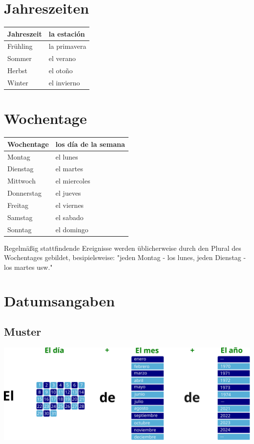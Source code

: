 \documentclass{spanish_summary}
\begin{document}
\section*{Jahreszeiten}
\begin{longtable}{p{} | p{}} 
\textbf{Jahreszeit}     & \textbf{la estación}                                       \\ \hline
\hline
\endhead %
Frühling & la primavera \\
Sommer & el verano \\
Herbst & el oto\~{n}o \\
Winter & el invierno \\
\end{longtable}

\newpage

\section*{Wochentage}
\begin{longtable}{p{} | p{}} 
\textbf{Wochentage}     & \textbf{los día de la semana}                                       \\ \hline
\hline
\endhead %
Montag & el lunes \\
Dienstag & el martes\\
Mittwoch & el miercoles \\
Donnerstag & el jueves \\
Freitag & el viernes\\
Samstag & el sabado \\
Sonntag & el domingo \\
\end{longtable}
Regelmäßig stattfindende Ereignisse werden üblicherweise durch den Plural des Wochentages gebildet, besipielsweise: "jeden Montag - los lunes, jeden Dienstag - los martes usw."

\section*{Datumsangaben}
\subsection*{Muster}
\begin{center}
  \includegraphics[scale=0.6]{datum.pdf}
\end{center}
\end{document}
